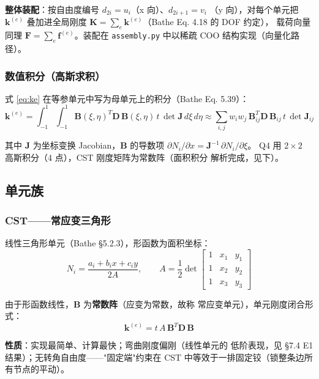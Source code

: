 \documentclass[12pt,a4paper]{ctexart}
\newcommand{\fem}{\Verb}
\begin{document}
\textbf{整体装配}：按自由度编号 $d_{2i} = u_i$（x 向）、$d_{2i+1} = v_i$
（y 向），对每个单元把 $\mathbf{k}^{(e)}$ 叠加进全局刚度
$\mathbf{K} = \sum_e \mathbf{k}^{(e)}$（Bathe Eq. 4.18 的 DOF 约定），
载荷向量同理 $\mathbf{F} = \sum_e \mathbf{f}^{(e)}$。装配在
\fem|assembly.py| 中以稀疏 COO 结构实现（向量化路径）。

\subsubsection{数值积分（高斯求积）}

式 \eqref{eq:ke} 在等参单元中写为母单元上的积分（Bathe Eq. 5.39）：
\begin{equation}
\mathbf{k}^{(e)} = \int_{-1}^{1}\int_{-1}^{1}
\mathbf{B}(\xi,\eta)^T \mathbf{D}\,\mathbf{B}(\xi,\eta)\,t\,\det\mathbf{J}\,d\xi\,d\eta
\approx \sum_{i,j} w_i w_j\, \mathbf{B}_{ij}^T \mathbf{D}\,\mathbf{B}_{ij}\,t\,\det\mathbf{J}_{ij}
\end{equation}

其中 $\mathbf{J}$ 为坐标变换 Jacobian，$\mathbf{B}$ 的导数项
$\partial N_i/\partial x = \mathbf{J}^{-1}\,\partial N_i/\partial \xi$。
Q4 用 $2\times2$ 高斯积分（4 点），CST 刚度矩阵为常数阵（面积积分
解析完成，见下）。

\subsection{单元族}

\subsubsection{CST——常应变三角形}

线性三角形单元（Bathe §5.2.3），形函数为面积坐标：
\begin{equation}
N_i = \frac{a_i + b_i x + c_i y}{2A}, \qquad
A = \frac{1}{2}\det\begin{bmatrix} 1 & x_1 & y_1 \\ 1 & x_2 & y_2 \\ 1 & x_3 & y_3 \end{bmatrix}
\end{equation}

由于形函数线性，$\mathbf{B}$ 为\textbf{常数阵}（应变为常数，故称
常应变单元），单元刚度闭合形式：
\begin{equation}
\mathbf{k}^{(e)} = t\,A\,\mathbf{B}^T \mathbf{D}\,\mathbf{B}
\end{equation}

\textbf{性质}：实现最简单、计算最快；弯曲刚度偏刚（线性单元的
低阶表现，见 §7.4 E1 结果）；无转角自由度——"固定端"约束在 CST
中等效于一排固定铰（锁整条边所有节点的平动）。
\end{document}
